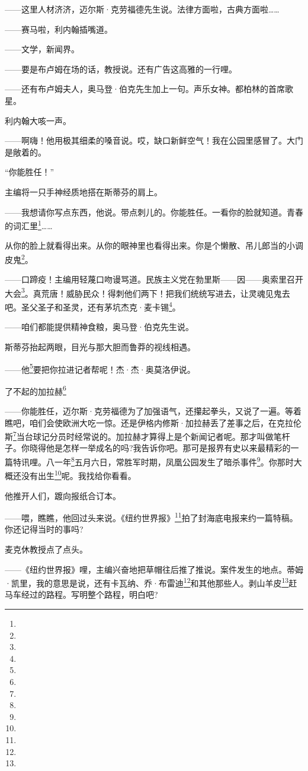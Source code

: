 \par ——这里人材济济，迈尔斯·克劳福德先生说。法律方面啦，古典方面啦……
\par ——赛马啦，利内翰插嘴道。
\par ——文学，新闻界。
\par ——要是布卢姆在场的话，教授说。还有广告这高雅的一行哩。
\par ——还有布卢姆夫人，奥马登·伯克先生加上一句。声乐女神。都柏林的首席歌星。
\par 利内翰大咳一声。
\par ——啊嗨！他用极其细柔的嗓音说。哎，缺口新鲜空气！我在公园里感冒了。大门是敞着的。
\par “你能胜任！”
\par 主编将一只手神经质地搭在斯蒂芬的肩上。
\par ——我想请你写点东西，他说。带点刺儿的。你能胜任。一看你的脸就知道。青春的词汇里\footnote{}……
\par 从你的脸上就看得出来。从你的眼神里也看得出来。你是个懒散、吊儿郎当的小调皮鬼\footnote{}。
\par ——口蹄疫！主编用轻蔑口吻谩骂道。民族主义党在勃里斯——因——奥索里召开大会\footnote{}。真荒唐！威胁民众！得刺他们两下！把我们统统写进去，让灵魂见鬼去吧。圣父圣子和圣灵，还有茅坑杰克·麦卡锡\footnote{}。
\par ——咱们都能提供精神食粮，奥马登·伯克先生说。
\par 斯蒂芬抬起两眼，目光与那大胆而鲁莽的视线相遇。
\par ——他\footnote{}要把你拉进记者帮呢！杰·杰·奥莫洛伊说。
\par 了不起的加拉赫\footnote{}
\par ——你能胜任，迈尔斯·克劳福德为了加强语气，还攥起拳头，又说了一遍。等着瞧吧，咱们会使欧洲大吃一惊。还是伊格内修斯·加拉赫丢了差事之后，在克拉伦斯\footnote{}当台球记分员时经常说的。加拉赫才算得上是个新闻记者呢。那才叫做笔杆子。你晓得他是怎样一举成名的吗?我告诉你吧。那可是报界有史以来最精彩的一篇特讯哩。八一年\footnote{}五月六日，常胜军时期，凤凰公园发生了暗杀事件\footnote{}。你那时大概还没有出生\footnote{}呢。我找给你看看。
\par 他推开人们，踱向报纸合订本。
\par ——喂，瞧瞧，他回过头来说。《纽约世界报》\footnote{}拍了封海底电报来约一篇特稿。你还记得当时的事吗?
\par 麦克休教授点了点头。
\par ——《纽约世界报》哩，主编兴奋地把草帽往后推了推说。案件发生的地点。蒂姆·凯里，我的意思是说，还有卡瓦纳、乔·布雷迪\footnote{}和其他那些人。剥山羊皮\footnote{}赶马车经过的路程。写明整个路程，明白吧?
